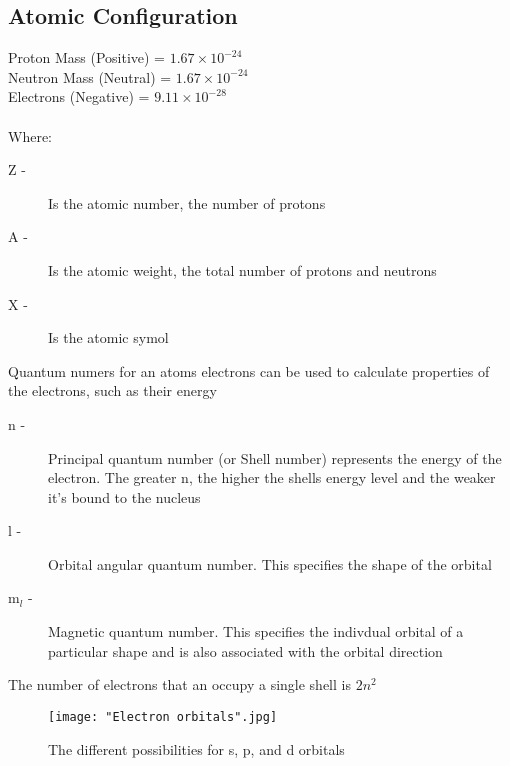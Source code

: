 \documentclass[a4paper, 12pt]{article}
\begin{document}
		\subsection{Atomic Configuration}
			Proton Mass (Positive) = $1.67\times10^{-24}$ \\
			Neutron Mass (Neutral) = $1.67\times10^{-24}$ \\
			Electrons (Negative) = $9.11\times10^{-28}$ \\
			
			 \\
			Where: \begin{description}
				\item [Z - ] Is the atomic number, the number of protons
				\item [A - ] Is the atomic weight, the total number of protons and neutrons
				\item [X - ] Is the atomic symol
			\end{description} 
			
	
			
			Quantum numers for an atoms electrons can be used to calculate properties of the electrons, such as their energy
			\begin{description}
				\item [n - ] Principal quantum number (or Shell number) represents the energy of the electron. The greater n, the higher the shells energy level and the weaker it's bound to the nucleus
				\item [l - ] Orbital angular quantum number. This specifies the shape of the orbital
				\item [m$_l$ - ] Magnetic quantum number. This specifies the indivdual orbital of a particular shape and is also associated with the orbital direction
			\end{description}
			
			The number of electrons that an occupy a single shell is $2n^2$ 		

			\begin{figure}[t]
				\texttt{[image: "Electron orbitals".jpg]} 
				\caption{The different possibilities for s, p, and d orbitals}
			\end{figure}
			
\end{document}
